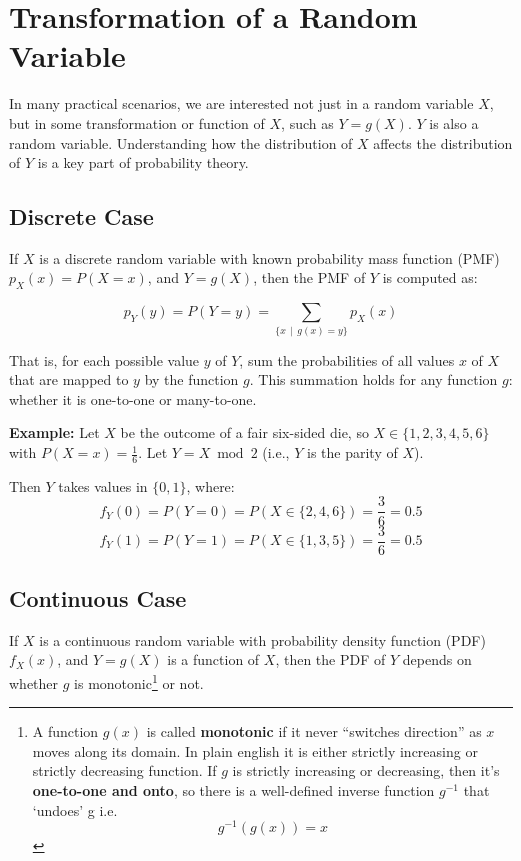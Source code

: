 \documentclass[twoside]{book}
\begin{document}


\section{Transformation of a Random Variable}

In many practical scenarios, we are interested not just in a random variable $X$, but in some transformation or {function} of $X$, such as $Y = g(X)$. $Y$ is also a random variable. Understanding how the distribution of $X$ affects the distribution of $Y$ is a key part of probability theory.

\subsection{Discrete Case}

If $X$ is a discrete random variable with known probability mass function (PMF) $p_X(x) = P(X=x)$, and $Y = g(X)$, then the PMF of $Y$ is computed as:

\begin{textbox}
\[
p_Y(y) = P(Y = y) = \sum_{\{x \,\mid \, g(x) = y\}} p_X(x)
\]
\end{textbox}

That is, for each possible value $y$ of $Y$, sum the probabilities of all values $x$ of $X$ that are mapped to $y$ by the function $g$. This summation holds for any function $g$: whether it is one-to-one or many-to-one.

\vspace{2mm}

\textbf{Example:} Let $X$ be the outcome of a fair six-sided die, so $X \in \{1, 2, 3, 4, 5, 6\}$ with $P(X = x) = \frac{1}{6}$. Let $Y = X \bmod 2$ (i.e., $Y$ is the parity of $X$).

Then $Y$ takes values in $\{0, 1\}$, where:
\[
f_Y(0) = P(Y = 0) = P(X \in \{2, 4, 6\}) = \frac{3}{6} = 0.5
\]
\[
f_Y(1) = P(Y = 1) = P(X \in \{1, 3, 5\}) = \frac{3}{6} = 0.5
\]

\subsection{Continuous Case}

If $X$ is a continuous random variable with probability density function (PDF) $f_X(x)$, and $Y = g(X)$ is a function of $X$, then the PDF of $Y$ depends on whether $g$ is monotonic\footnote{A function $g(x)$ is called \textbf{monotonic} if it never ``switches direction'' as $x$ moves along its domain. In plain english it is either strictly increasing or strictly decreasing function. If $g$ is strictly increasing or decreasing, then it’s \textbf{one-to-one and onto}, so there is a well-defined inverse function $g^{-1}$  that `undoes' g i.e.
  $$g^{-1}(g(x)) = x$$} or not.
\end{document}
